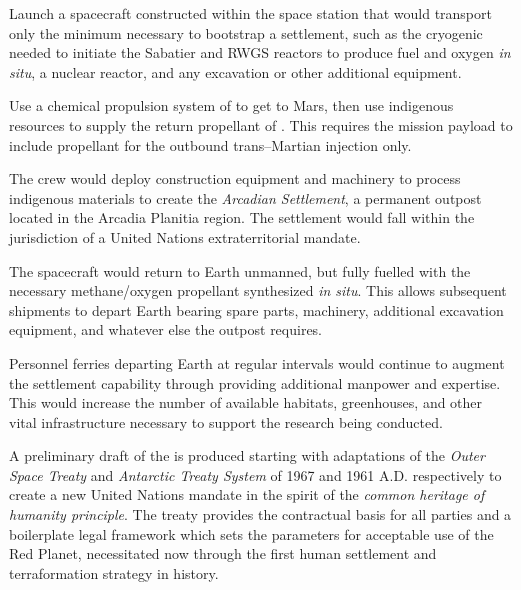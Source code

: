 \item Launch a spacecraft constructed within the space station that would transport only the minimum necessary to bootstrap a settlement, such as the cryogenic  needed to initiate the Sabatier and RWGS reactors to produce fuel and oxygen {\it in situ}, a nuclear reactor, and any excavation or other additional equipment.

\item Use a chemical propulsion system of  to get to Mars, then use indigenous resources to supply the return propellant of . This requires the mission payload to include propellant for the outbound trans--Martian injection only.

\item The crew would deploy construction equipment and machinery to process indigenous materials to create the {\it Arcadian Settlement}, a permanent outpost located in the Arcadia Planitia region. The settlement would fall within the jurisdiction of a United Nations extraterritorial mandate.

\item The spacecraft would return to Earth unmanned, but fully fuelled with the necessary methane/oxygen propellant synthesized {\it in situ}. This allows subsequent shipments to depart Earth bearing spare parts, machinery, additional excavation equipment, and whatever else the outpost requires.

\item Personnel ferries departing Earth at regular intervals would continue to augment the settlement capability through providing additional manpower and expertise. This would increase the number of available habitats, greenhouses, and other vital infrastructure necessary to support the research being conducted.
\stopitemize

A preliminary draft of the  is produced starting with adaptations of the {\it Outer Space Treaty} and {\it Antarctic Treaty System} of 1967 and 1961 A.D. respectively to create a new United Nations mandate in the spirit of the {\it common heritage of humanity principle}. The treaty provides the contractual basis for all parties and a boilerplate legal framework which sets the parameters for acceptable use of the Red Planet, necessitated now through the first human settlement and terraformation strategy in history. 

